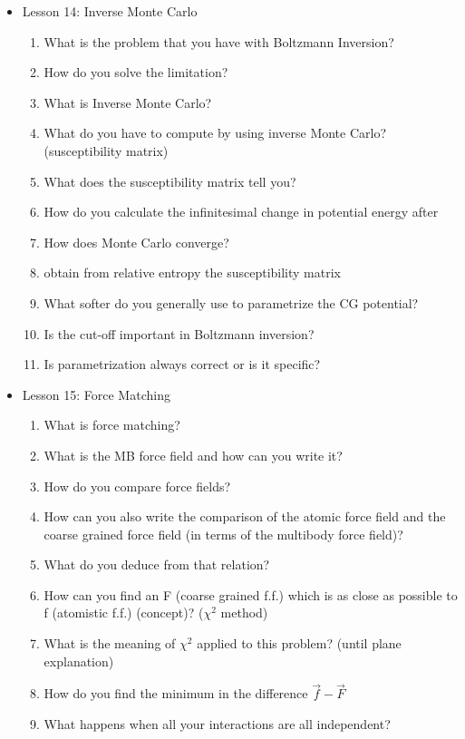 {\begin{itemize}
\begin{enumerate}
    \end{enumerate}
    \item Lesson 14: Inverse Monte Carlo
    \begin{enumerate}
        \item What is the problem that you have with Boltzmann Inversion?
        \item How do you solve the limitation?
        \item What is Inverse Monte Carlo?
        \item What do you have to compute by using inverse Monte Carlo? (susceptibility matrix)
        \item What does the susceptibility matrix tell you?
        \item How do you calculate the infinitesimal change in potential energy after
        \item How does Monte Carlo converge?
        \item obtain from relative entropy the susceptibility matrix
        \item What softer do you generally use to parametrize the CG  potential?
        \item Is the cut-off important in Boltzmann inversion?
        \item Is parametrization always correct or is it specific?
    \end{enumerate}
    \item Lesson 15: Force Matching
    \begin{enumerate}
        \item What is force matching?
        \item What is the MB force field and how can you write it?
        \item How do you compare force fields?
        \item How can you also write the comparison of the atomic force field and the coarse grained force field (in terms of the multibody force field)?
        \item What do you deduce from that relation?
        \item How can you find an F (coarse grained f.f.) which is as close as possible to f (atomistic f.f.) (concept)? ($\chi^2$ method) 
        \item What is the meaning of $\chi^2$ applied to this problem? (until plane explanation)
        \item How do you find the minimum in the difference $\vec{f} - \vec{F}$
        \item What happens when all your interactions are all independent?

\end{enumerate}
\end{itemize}}
